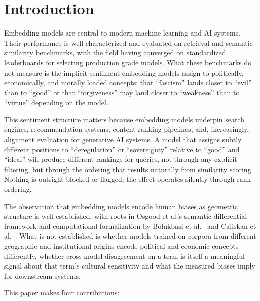 \documentclass[11pt, letterpaper]{article}
\begin{document}
\section{Introduction}

Embedding models are central to modern machine learning and AI systems. Their performance is well characterized and evaluated on retrieval and semantic similarity benchmarks, with the field having converged on standardized leaderboards for selecting production grade models. What these benchmarks do not measure is the implicit sentiment embedding models assign to politically, economically, and morally loaded concepts: that ``fascism'' lands closer to ``evil'' than to ``good'' or that ``forgiveness'' may land closer to ``weakness'' than to ``virtue'' depending on the model.

This sentiment structure matters because embedding models underpin search engines, recommendation systems, content ranking pipelines, and, increasingly, alignment evaluation for generative AI systems. A model that assigns subtly different positions to ``deregulation'' or ``sovereignty'' relative to ``good'' and ``ideal'' will produce different rankings for queries, not through any explicit filtering, but through the ordering that results naturally from similarity scoring. Nothing is outright blocked or flagged; the effect operates silently through rank ordering.

The observation that embedding models encode human biases as geometric structure is well established, with roots in Osgood et al.'s \cite{osgood1957} semantic differential framework and computational formalization by Bolukbasi et al.\ \cite{bolukbasi2016} and Caliskan et al.\ \cite{caliskan2017}. What is not established is whether models trained on corpora from different geographic and institutional origins encode political and economic concepts differently, whether cross-model disagreement on a term is itself a meaningful signal about that term's cultural sensitivity and what the measured biases imply for downstream systems.

This paper makes four contributions:
\end{document}
